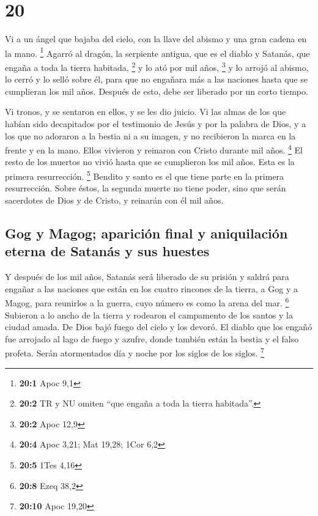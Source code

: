 \hypertarget{section-19}{%
\section{20}\label{section-19}}

 Vi a un ángel que bajaba del cielo, con la llave del
abismo y una gran cadena en la mano. \footnote{\textbf{20:1} Apoc 9,1}
 Agarró al dragón, la serpiente antigua, que es el diablo
y Satanás, que engaña a toda la tierra habitada, \footnote{\textbf{20:2}
  TR y NU omiten ``que engaña a toda la tierra habitada''.} y lo ató por
mil años, \footnote{\textbf{20:2} Apoc 12,9}  y lo arrojó
al abismo, lo cerró y lo selló sobre él, para que no engañara más a las
naciones hasta que se cumplieran los mil años. Después de esto, debe ser
liberado por un corto tiempo.

 Vi tronos, y se sentaron en ellos, y se les dio juicio.
Vi las almas de los que habían sido decapitados por el testimonio de
Jesús y por la palabra de Dios, y a los que no adoraron a la bestia ni a
su imagen, y no recibieron la marca en la frente y en la mano. Ellos
vivieron y reinaron con Cristo durante mil años. \footnote{\textbf{20:4}
  Apoc 3,21; Mat 19,28; 1Cor 6,2}  El resto de los muertos
no vivió hasta que se cumplieron los mil años. Esta es la primera
resurrección. \footnote{\textbf{20:5} 1Tes 4,16}  Bendito
y santo es el que tiene parte en la primera resurrección. Sobre éstos,
la segunda muerte no tiene poder, sino que serán sacerdotes de Dios y de
Cristo, y reinarán con él mil años.

\hypertarget{gog-y-magog-apariciuxf3n-final-y-aniquilaciuxf3n-eterna-de-satanuxe1s-y-sus-huestes}{%
\subsection{Gog y Magog; aparición final y aniquilación eterna de
Satanás y sus
huestes}\label{gog-y-magog-apariciuxf3n-final-y-aniquilaciuxf3n-eterna-de-satanuxe1s-y-sus-huestes}}

 Y después de los mil años, Satanás será liberado de su
prisión  y saldrá para engañar a las naciones que están en
los cuatro rincones de la tierra, a Gog y a Magog, para reunirlos a la
guerra, cuyo número es como la arena del mar. \footnote{\textbf{20:8}
  Ezeq 38,2}  Subieron a lo ancho de la tierra y rodearon
el campamento de los santos y la ciudad amada. De Dios bajó fuego del
cielo y los devoró.  El diablo que los engañó fue
arrojado al lago de fuego y azufre, donde también están la bestia y el
falso profeta. Serán atormentados día y noche por los siglos de los
siglos. \footnote{\textbf{20:10} Apoc 19,20}

